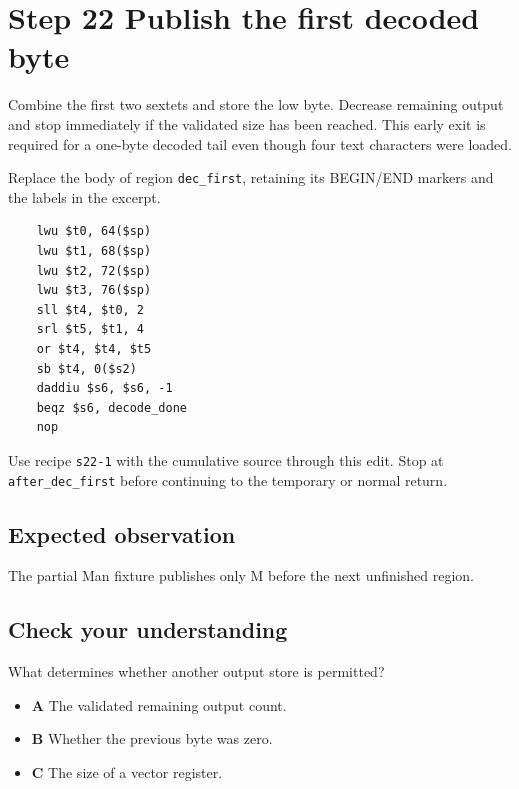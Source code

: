 \section{Step 22 Publish the first decoded byte}\label{base64-s22}

Combine the first two sextets and store the low byte. Decrease remaining output and stop immediately if the validated size has been reached. This early exit is required for a one-byte decoded tail even though four text characters were loaded.

Replace the body of region \texttt{dec\_first}, retaining its BEGIN/END markers and the labels in the excerpt.

\begin{verbatim}
    lwu $t0, 64($sp)
    lwu $t1, 68($sp)
    lwu $t2, 72($sp)
    lwu $t3, 76($sp)
    sll $t4, $t0, 2
    srl $t5, $t1, 4
    or $t4, $t4, $t5
    sb $t4, 0($s2)
    daddiu $s6, $s6, -1
    beqz $s6, decode_done
    nop
\end{verbatim}

Use recipe \texttt{s22-1} with the cumulative source through this edit. Stop at \texttt{after\_dec\_first} before continuing to the temporary or normal return.

\subsection{Expected observation}
The partial Man fixture publishes only M before the next unfinished region.

\subsection{Check your understanding}
What determines whether another output store is permitted?

\begin{itemize}
  \item \textbf{A} The validated remaining output count.
  \item \textbf{B} Whether the previous byte was zero.
  \item \textbf{C} The size of a vector register.
\end{itemize}
